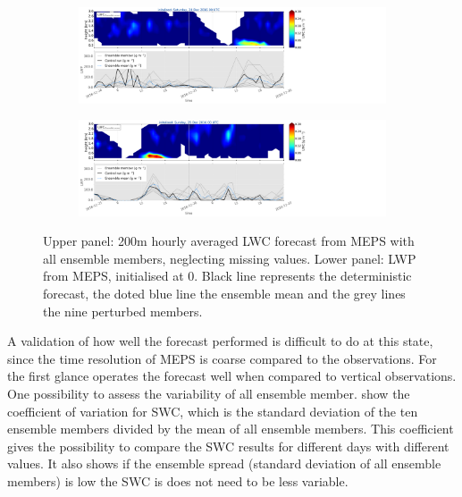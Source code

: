 \begin{figure}[t]
	\centering
	\begin{subfigure}[b]{\textwidth}
		\centering
		\includegraphics[trim={0.cm 1.9cm 26.5cm 0.4cm},clip,width=\textwidth]{./fig_vert_LWC_EM/20161224}
		\caption{}\label{fig:LWC:24}
	\end{subfigure}
	\begin{subfigure}[b]{\textwidth}
		\centering
		\includegraphics[trim={0.cm 1.9cm 26.5cm 0.4cm},clip,width=\textwidth]{./fig_vert_LWC_EM/20161225}
		\caption{}\label{fig:LWC:25}
	\end{subfigure}
	\caption{Upper panel: 200m hourly averaged LWC forecast from MEPS with all ensemble members, neglecting missing values.
		Lower panel: LWP from MEPS, initialised at \SI{0}{\UTC}. Black line represents the deterministic
		forecast, the doted blue line the ensemble mean and the grey lines the nine perturbed
		members.}\label{fig:LWC:2425}
\end{figure}
A validation of how well the forecast performed is difficult to do at this state, since the time resolution of MEPS is coarse compared to the observations. For the first glance operates the forecast well when compared to vertical observations. One possibility to assess the variability of all ensemble member. 
 show the coefficient of variation for SWC, which is the standard deviation of the ten ensemble members divided by the mean of all ensemble members. This coefficient gives the possibility to compare the SWC results for different days with different values. It also shows if the ensemble spread (standard deviation of all ensemble members) is low the SWC is does not need to be less variable.
